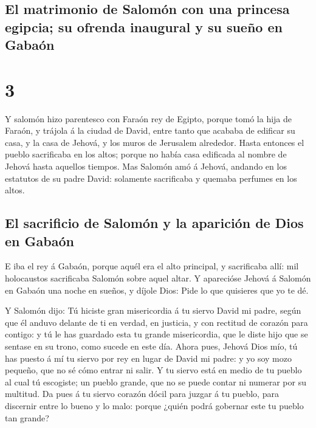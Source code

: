 \hypertarget{el-matrimonio-de-salomuxf3n-con-una-princesa-egipcia-su-ofrenda-inaugural-y-su-sueuxf1o-en-gabauxf3n}{%
\subsection{El matrimonio de Salomón con una princesa egipcia; su
ofrenda inaugural y su sueño en
Gabaón}\label{el-matrimonio-de-salomuxf3n-con-una-princesa-egipcia-su-ofrenda-inaugural-y-su-sueuxf1o-en-gabauxf3n}}

\hypertarget{section-2}{%
\section{3}\label{section-2}}

 Y salomón hizo parentesco con Faraón rey de Egipto, porque
tomó la hija de Faraón, y trájola á la ciudad de David, entre tanto que
acababa de edificar su casa, y la casa de Jehová, y los muros de
Jerusalem alrededor.  Hasta entonces el pueblo sacrificaba
en los altos; porque no había casa edificada al nombre de Jehová hasta
aquellos tiempos.  Mas Salomón amó á Jehová, andando en los
estatutos de su padre David: solamente sacrificaba y quemaba perfumes en
los altos.

\hypertarget{el-sacrificio-de-salomuxf3n-y-la-apariciuxf3n-de-dios-en-gabauxf3n}{%
\subsection{El sacrificio de Salomón y la aparición de Dios en
Gabaón}\label{el-sacrificio-de-salomuxf3n-y-la-apariciuxf3n-de-dios-en-gabauxf3n}}

 E iba el rey á Gabaón, porque aquél era el alto principal,
y sacrificaba allí: mil holocaustos sacrificaba Salomón sobre aquel
altar.  Y aparecióse Jehová á Salomón en Gabaón una noche en
sueños, y díjole Dios: Pide lo que quisieres que yo te dé.

 Y Salomón dijo: Tú hiciste gran misericordia á tu siervo
David mi padre, según que él anduvo delante de ti en verdad, en
justicia, y con rectitud de corazón para contigo: y tú le has guardado
esta tu grande misericordia, que le diste hijo que se sentase en su
trono, como sucede en este día.  Ahora pues, Jehová Dios
mío, tú has puesto á mí tu siervo por rey en lugar de David mi padre: y
yo soy mozo pequeño, que no sé cómo entrar ni salir.  Y tu
siervo está en medio de tu pueblo al cual tú escogiste; un pueblo
grande, que no se puede contar ni numerar por su multitud. 
Da pues á tu siervo corazón dócil para juzgar á tu pueblo, para
discernir entre lo bueno y lo malo: porque ¿quién podrá gobernar este tu
pueblo tan grande?

